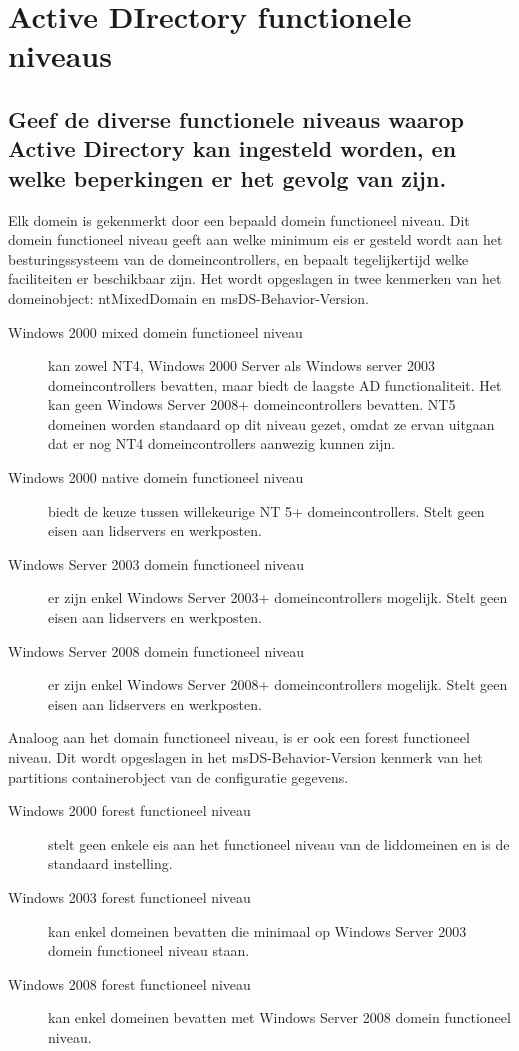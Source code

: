 \chapter{Active DIrectory functionele niveaus}

\section{Geef de diverse functionele niveaus waarop Active Directory kan
ingesteld worden, en welke beperkingen er het gevolg van zijn.}

Elk domein is gekenmerkt door een bepaald domein functioneel niveau. Dit domein
functioneel niveau geeft aan welke minimum eis er gesteld wordt aan het
besturingssysteem van de domeincontrollers, en bepaalt tegelijkertijd welke
faciliteiten er beschikbaar zijn. Het wordt opgeslagen in twee kenmerken van het
domeinobject: ntMixedDomain en msDS-Behavior-Version.
\begin{description}
	\item[Windows 2000 mixed domein functioneel niveau] kan zowel NT4,
		Windows 2000 Server als Windows server 2003 domeincontrollers
		bevatten, maar biedt de laagste AD functionaliteit. Het kan geen
		Windows Server 2008+ domeincontrollers bevatten. NT5 domeinen
		worden standaard op dit niveau gezet, omdat ze ervan uitgaan dat
		er nog NT4 domeincontrollers aanwezig kunnen zijn.
	\item[Windows 2000 native domein functioneel niveau] biedt de keuze
		tussen willekeurige NT 5+ domeincontrollers. Stelt geen eisen
		aan lidservers en werkposten.
	\item[Windows Server 2003 domein functioneel niveau] er zijn enkel
		Windows Server 2003+ domeincontrollers mogelijk. Stelt geen
		eisen aan lidservers en werkposten.
	\item[Windows Server 2008 domein functioneel niveau] er zijn enkel
		Windows Server 2008+ domeincontrollers mogelijk. Stelt geen
		eisen aan lidservers en werkposten.
\end{description}

Analoog aan het domain functioneel niveau, is er ook een forest functioneel
niveau. Dit wordt opgeslagen in het msDS-Behavior-Version kenmerk van het
partitions containerobject van de configuratie gegevens.
\begin{description}
	\item[Windows 2000 forest functioneel niveau] stelt geen enkele eis aan
		het functioneel niveau van de liddomeinen en is de standaard
		instelling.
	\item[Windows 2003 forest functioneel niveau] kan enkel domeinen
		bevatten die minimaal op Windows Server 2003 domein functioneel
		niveau staan.
	\item[Windows 2008 forest functioneel niveau] kan enkel domeinen
		bevatten met Windows Server 2008 domein functioneel niveau.
\end{description}

